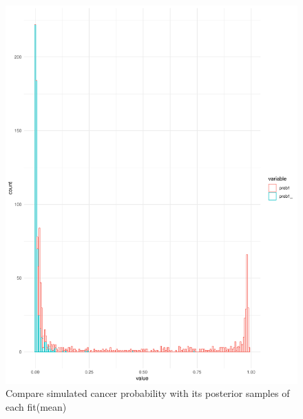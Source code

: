 \documentclass{article}
\begin{document}
  \begin{figure}[!htb]
  \centering
    \includegraphics[width=\textwidth]{writeup/figures/horseshoe_prob1.pdf}
    \caption{Compare simulated cancer probability with its posterior samples of each fit(mean)}
    \label{fig:hhProb1}
  \end{figure}
  
  
  
  
  
  
 
\end{document}
